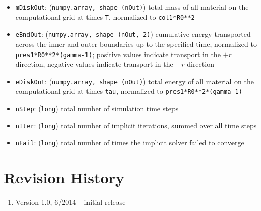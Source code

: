 \documentclass[12pt]{article}
\begin{document}
\begin{itemize}
\item \texttt{mDiskOut}: (\texttt{numpy.array, shape (nOut)}) total mass of all material on the computational grid at times \verb=T=, normalized to \verb=col1*R0**2=
\item \texttt{eBndOut}: (\texttt{numpy.array, shape (nOut, 2)}) cumulative energy transported across the inner and outer boundaries up to the specified time, normalized to \\\verb=pres1*R0**2*(gamma-1)=; positive values indicate transport in the $+r$ direction, negative values indicate transport in the $-r$ direction
\item \texttt{eDiskOut}: (\texttt{numpy.array, shape (nOut)}) total energy of all material on the computational grid at times \verb=tau=, normalized to \verb=pres1*R0**2*(gamma-1)=
\item \texttt{nStep}: (\texttt{long}) total number of simulation time steps
\item \texttt{nIter}: (\texttt{long}) total number of implicit iterations, summed over all time steps
\item \texttt{nFail}: (\texttt{long}) total number of times the implicit solver failed to converge
\end{itemize}



\section{Revision History}

\begin{enumerate}
\item Version 1.0, 6/2014 -- initial release
\end{enumerate}
\end{document}
